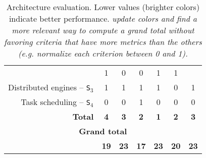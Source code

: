 \documentclass[preprint,3p,twocolumn]{elsarticle}
\newcommand{\todo}[1]{\color{blue}\xspace\emph{#1}\xspace\color{black}}
\begin{document}
\begin{table*}
\begin{tabular}{rcccccc}
                                     & \cellcolor[HTML]{99DD99}1
                                     & \cellcolor[HTML]{99FF99}0
                                     & \cellcolor[HTML]{99FF99}0
                                     & \cellcolor[HTML]{99DD99}1
                                     & \cellcolor[HTML]{99DD99}1 \\
Distributed engines -- \texttt{S$_3$}& \cellcolor[HTML]{99AA99}1
                                     & \cellcolor[HTML]{99AA99}1
                                     & \cellcolor[HTML]{99AA99}1
                                     & \cellcolor[HTML]{99AA99}1
                                     & \cellcolor[HTML]{99FF99}0
                                     & \cellcolor[HTML]{99AA99}1 \\
Task scheduling -- \texttt{S$_4$}    & \cellcolor[HTML]{99FF99}0
                                     & \cellcolor[HTML]{99FF99}0
                                     & \cellcolor[HTML]{99AA99}1
                                     & \cellcolor[HTML]{99FF99}0
                                     & \cellcolor[HTML]{99FF99}0
                                     & \cellcolor[HTML]{99FF99}0 \\
\textbf{Total}                       & \cellcolor[HTML]{99AA99}\textbf{4}
                                     & \cellcolor[HTML]{99BB99}\textbf{3}
                                     & \cellcolor[HTML]{99DD99}\textbf{2}
                                     & \cellcolor[HTML]{99FF99}\textbf{1}
                                     & \cellcolor[HTML]{99DD99}\textbf{2}
                                     & \cellcolor[HTML]{99BB99}\textbf{3} \\
\multicolumn{7}{c}{\cellcolor[HTML]{EEEEEE}\textbf{Grand total}}\\
                                     & \cellcolor[HTML]{99CC99}\textbf{19}
                                     & \cellcolor[HTML]{99BB99}\textbf{23}
                                     & \cellcolor[HTML]{99FF99}\textbf{17}
                                     & \cellcolor[HTML]{99CC99}\textbf{23}
                                     & \cellcolor[HTML]{99DD99}\textbf{20}
                                     & \cellcolor[HTML]{99AA99}\textbf{23}
\end{tabular}
\caption{Architecture evaluation. Lower values (brighter colors) indicate better performance. \todo{update colors and find a more relevant way to compute a grand total without favoring criteria that have more metrics than the others (e.g. normalize each criterion between 0 and 1).}}
\label{table:evaluation}
\end{table*}
\end{document}
